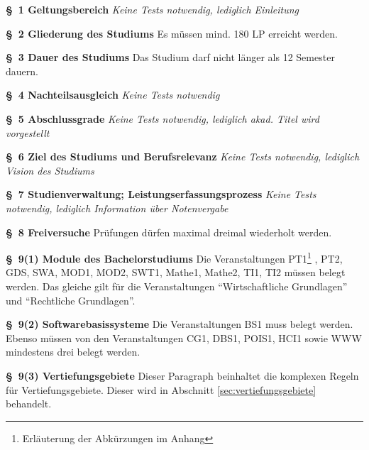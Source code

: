 \documentclass[ngerman]{article}
\begin{document}
\begin{paracol}{2}
\textbf{§~1 Geltungsbereich}
\switchcolumn
\emph{Keine Tests notwendig, lediglich Einleitung}
\\
\switchcolumn*

\textbf{§~2 Gliederung des Studiums}
\switchcolumn
Es müssen mind. 180 LP erreicht werden.
\\
\switchcolumn*

\textbf{§~3 Dauer des Studiums}
\switchcolumn
Das Studium darf nicht länger als 12 Semester dauern.
\\
\switchcolumn*

\textbf{§~4 Nachteilsausgleich}
\switchcolumn
\emph{Keine Tests notwendig}
\\
\switchcolumn*

\textbf{§~5 Abschlussgrade}
\switchcolumn
\emph{Keine Tests notwendig, lediglich akad. Titel wird vorgestellt}
\\
\switchcolumn*

\textbf{§~6 Ziel des Studiums und Berufsrelevanz}
\switchcolumn
\emph{Keine Tests notwendig, lediglich Vision des Studiums}
\\
\switchcolumn*

\textbf{§~7 Studienverwaltung; Leis\-tungs\-er\-fas\-sungs\-pro\-zess}
\switchcolumn
\emph{Keine Tests notwendig, lediglich Information über Notenvergabe}
\\
\switchcolumn*

\textbf{§~8 Freiversuche}
\switchcolumn
Prüfungen dürfen maximal dreimal wie\-der\-holt werden.
\\
\switchcolumn*

\textbf{§~9(1) Module des Bachelorstudiums}
\switchcolumn
Die Veranstaltungen PT1\footnote{Erläuterung der Abkürzungen im Anhang} , PT2, GDS, SWA, MOD1, MOD2, SWT1, Mathe1, Mathe2, TI1, TI2 müssen belegt werden.
Das gleiche gilt für die Veranstaltungen ``Wirtschaftliche Grundlagen'' und ``Rechtliche Grundlagen''.
\\
\switchcolumn*

\textbf{§~9(2) Softwarebasissysteme}
\switchcolumn
Die Veranstaltungen BS1 muss belegt werden.
Ebenso müssen von den  Veranstaltungen CG1, DBS1, POIS1, HCI1 sowie WWW mindestens drei belegt werden.
\\
\switchcolumn*

\textbf{§~9(3) Vertiefungsgebiete}
\switchcolumn
Dieser Paragraph beinhaltet die komplexen Regeln für Vertiefungsgebiete.
Dieser wird in Abschnitt \ref{sec:vertiefungsgebiete} behandelt.
\\
\switchcolumn*


\end{paracol}
\end{document}
